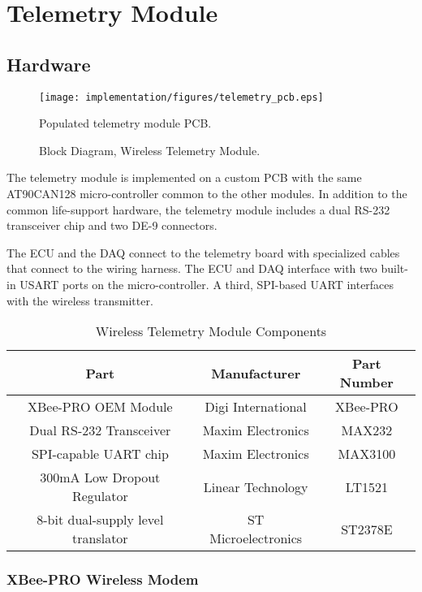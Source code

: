 \section{Telemetry Module}

\subsection{Hardware}

\begin{figure}[H]
\centering
\texttt{[image: implementation/figures/telemetry\_pcb.eps]}
\caption{Populated telemetry module PCB.}\label{fig:telemetry_pcb}
\end{figure}


\begin{figure}[H]
\centering

\caption{Block Diagram, Wireless Telemetry Module.\label{fig:tele_tx_overview}}
\end{figure}

The telemetry module is implemented on a custom PCB with the same AT90CAN128 micro-controller common to the other modules. In addition to the common life-support hardware, the telemetry module includes a dual RS-232 transceiver chip and two DE-9 connectors. 

The ECU and the DAQ connect to the telemetry board with specialized cables that connect to the wiring harness. The ECU and DAQ interface with two built-in USART ports on the micro-controller. A third, SPI-based UART interfaces with the wireless transmitter.

\begin{table}[H]
  \caption{Wireless Telemetry Module Components\label{tab:telmetry_module_components}}
  \centering
    \begin{tabular}{|c|c|c|}
      \hline 
      Part & Manufacturer & Part Number\tabularnewline
      \hline
      \hline
      XBee-PRO OEM Module & Digi International & XBee-PRO\tabularnewline
      \hline 
      Dual RS-232 Transceiver & Maxim Electronics & MAX232\tabularnewline
      \hline 
      SPI-capable UART chip & Maxim Electronics & MAX3100\tabularnewline
      \hline 
      300mA Low Dropout Regulator & Linear Technology & LT1521\tabularnewline
      \hline
      8-bit dual-supply level translator & ST Microelectronics & ST2378E\tabularnewline
      \hline
    \end{tabular}
\end{table}


\subsubsection{XBee-PRO Wireless Modem}

